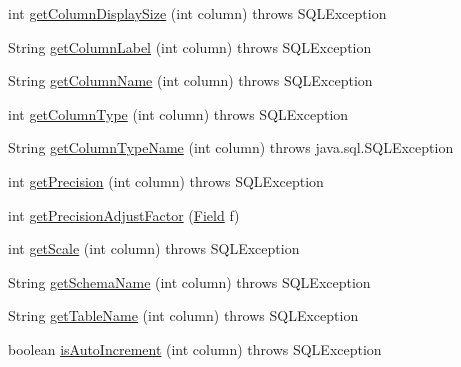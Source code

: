 \begin{DoxyCompactItemize}
\item 
int \mbox{\hyperlink{classcom_1_1mysql_1_1cj_1_1jdbc_1_1result_1_1_result_set_meta_data_ae245d040d21a1c05f3d3b4fae0f9b021}{get\+Column\+Display\+Size}} (int column)  throws S\+Q\+L\+Exception 
\item 
String \mbox{\hyperlink{classcom_1_1mysql_1_1cj_1_1jdbc_1_1result_1_1_result_set_meta_data_a61dd71656173944ed359540d5f2146a3}{get\+Column\+Label}} (int column)  throws S\+Q\+L\+Exception 
\item 
String \mbox{\hyperlink{classcom_1_1mysql_1_1cj_1_1jdbc_1_1result_1_1_result_set_meta_data_a31a13a989ee87ea1a9f1f4aa874bd771}{get\+Column\+Name}} (int column)  throws S\+Q\+L\+Exception 
\item 
int \mbox{\hyperlink{classcom_1_1mysql_1_1cj_1_1jdbc_1_1result_1_1_result_set_meta_data_af71205559fb1123e6d8950c5a67a69e3}{get\+Column\+Type}} (int column)  throws S\+Q\+L\+Exception 
\item 
String \mbox{\hyperlink{classcom_1_1mysql_1_1cj_1_1jdbc_1_1result_1_1_result_set_meta_data_a9d676c2fb0aa1e384e96d677f130072d}{get\+Column\+Type\+Name}} (int column)  throws java.\+sql.\+S\+Q\+L\+Exception 
\item 
int \mbox{\hyperlink{classcom_1_1mysql_1_1cj_1_1jdbc_1_1result_1_1_result_set_meta_data_ad52b77534649ebdb9414a85c0ff7cf58}{get\+Precision}} (int column)  throws S\+Q\+L\+Exception 
\item 
int \mbox{\hyperlink{classcom_1_1mysql_1_1cj_1_1jdbc_1_1result_1_1_result_set_meta_data_a783ecdb9c7cacbc43faec6578c7b124d}{get\+Precision\+Adjust\+Factor}} (\mbox{\hyperlink{classcom_1_1mysql_1_1cj_1_1result_1_1_field}{Field}} f)
\item 
int \mbox{\hyperlink{classcom_1_1mysql_1_1cj_1_1jdbc_1_1result_1_1_result_set_meta_data_aca119b251bf316c2191439a84970b275}{get\+Scale}} (int column)  throws S\+Q\+L\+Exception 
\item 
String \mbox{\hyperlink{classcom_1_1mysql_1_1cj_1_1jdbc_1_1result_1_1_result_set_meta_data_a380d616e49af1311581c0e5ac51383a7}{get\+Schema\+Name}} (int column)  throws S\+Q\+L\+Exception 
\item 
String \mbox{\hyperlink{classcom_1_1mysql_1_1cj_1_1jdbc_1_1result_1_1_result_set_meta_data_a8a562f4a15f95b436faccb17586dd031}{get\+Table\+Name}} (int column)  throws S\+Q\+L\+Exception 
\item 
boolean \mbox{\hyperlink{classcom_1_1mysql_1_1cj_1_1jdbc_1_1result_1_1_result_set_meta_data_a9983a9e7e92e9e9fcbe77ff2f142fdf3}{is\+Auto\+Increment}} (int column)  throws S\+Q\+L\+Exception 

\end{DoxyCompactItemize}
